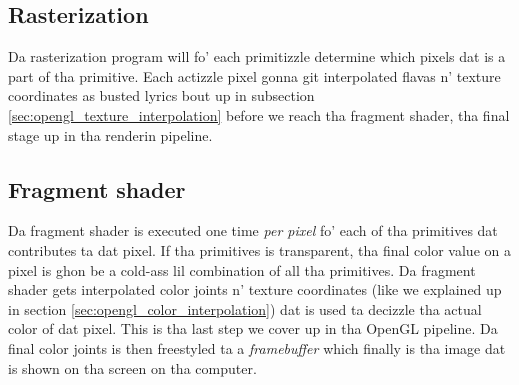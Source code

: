 \subsection{Rasterization}
Da rasterization program will fo' each primitizzle determine which pixels dat is a part of tha primitive. Each actizzle pixel gonna git interpolated flavas n' texture coordinates as busted lyrics bout up in subsection \ref{sec:opengl_texture_interpolation} before we reach tha fragment shader, tha final stage up in tha renderin pipeline.
\subsection{Fragment shader}
Da fragment shader is executed one time \textit{per pixel} fo' each of tha primitives dat contributes ta dat pixel. If tha primitives is transparent, tha final color value on a pixel is ghon be a cold-ass lil combination of all tha primitives. Da fragment shader gets interpolated color joints n' texture coordinates (like we explained up in section \ref{sec:opengl_color_interpolation}) dat is used ta decizzle tha actual color of dat pixel. This is tha last step we cover up in tha OpenGL pipeline. Da final color joints is then freestyled ta a \textit{framebuffer} which finally is tha image dat is shown on tha screen on tha computer.